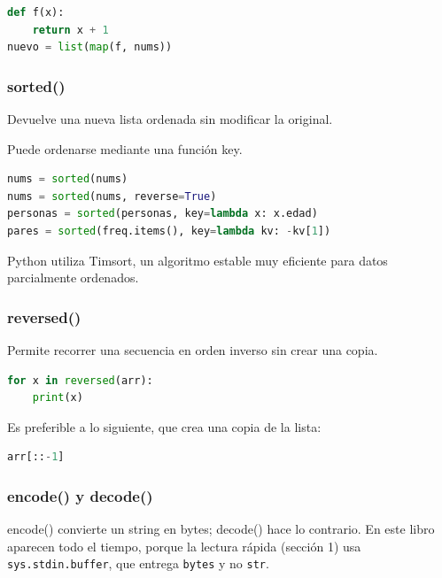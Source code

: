 \begin{lstlisting}[language=Python]
def f(x):
    return x + 1
nuevo = list(map(f, nums))
\end{lstlisting}

\vspace{0.3cm}

\subsubsection{sorted()}

Devuelve una nueva lista ordenada sin modificar la original.

Puede ordenarse mediante una función key.

\begin{lstlisting}[language=Python]
nums = sorted(nums)
nums = sorted(nums, reverse=True)
personas = sorted(personas, key=lambda x: x.edad)
pares = sorted(freq.items(), key=lambda kv: -kv[1])
\end{lstlisting}

 

Python utiliza Timsort, un algoritmo estable muy eficiente para datos parcialmente ordenados.

\vspace{0.3cm}

\subsubsection{reversed()}

Permite recorrer una secuencia en orden inverso sin crear una copia.

\begin{lstlisting}[language=Python]
for x in reversed(arr):
    print(x)
\end{lstlisting}

Es preferible a lo siguiente, que crea una copia de la lista:

\begin{lstlisting}[language=Python]
arr[::-1]
\end{lstlisting}

\vspace{0.3cm}

\subsubsection{encode() y decode()}

encode() convierte un string en bytes; decode() hace lo contrario. En este libro
aparecen todo el tiempo, porque la lectura rápida (sección 1) usa
\texttt{sys.stdin.buffer}, que entrega \texttt{bytes} y no \texttt{str}.

